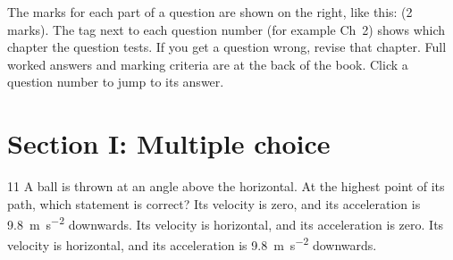 The marks for each part of a question are shown on the right, like this: \textcolor{hscmuted}{\small(2 marks)}.
The tag next to each question number (for example \textcolor{hscbrand}{Ch~2}) shows which chapter
the question tests. If you get a question wrong, revise that chapter. Full worked answers and
marking criteria are at the back of the book. Click a question number to jump to its answer.

\section*{Section I: Multiple choice}

\begin{practiceq}{1}{1}\label{pq:top}
A ball is thrown at an angle above the horizontal. At the highest point of its path, which
statement is correct?
  {Its velocity is zero, and its acceleration is \qty{9.8}{m.s^{-2}} downwards.}
  {Its velocity is horizontal, and its acceleration is zero.}
  {Its velocity is horizontal, and its acceleration is \qty{9.8}{m.s^{-2}} downwards.}
\end{practiceq}

